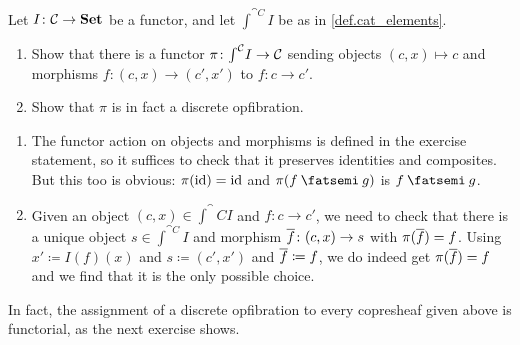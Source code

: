 \documentclass[Book-Poly]{subfiles}
\begin{document}
\begin{exercise} \label{exc.copre_to_dopf}
Let $I\colon\mathcal{C}\to\mathbf{Set}$ be a functor, and let $\int^{\cat{C}}I$ be as in \cref{def.cat_elements}.
\begin{enumerate}
    \item Show that there is a functor $\pi\colon\textstyle{\int}^{\mathcal{C}}I\to\mathcal{C}$ sending objects $(c,x)\mapsto c$ and morphisms $f\colon(c,x)\to(c',x')$ to $f\colon c\to c'$.
    \item Show that $\pi$ is in fact a discrete opfibration. \qedhere
\end{enumerate}
\begin{solution}
\begin{enumerate}
    \item The functor action on objects and morphisms is defined in the exercise statement, so it suffices to check that it preserves identities and composites. But this too is obvious: $\pi(\mathrm{id})=\mathrm{id}$ and $\pi(f\then g)$ is $f\then g$.
    \item Given an object $(c,x)\in\int^\cat{C}I$ and $f\colon c\to c'$, we need to check that there is a unique object $s\in\int^{\cat{C}}I$ and morphism $\overline{f}\colon(c,x)\to s$ with $\pi(\overline{f})=f$. Using $x'\coloneqq I(f)(x)$ and $s\coloneqq(c',x')$ and $\overline{f}\coloneqq f$, we do indeed get $\pi(\overline{f})=f$ and we find that it is the only possible choice.
\end{enumerate}
\end{solution}
\end{exercise}

In fact, the assignment of a discrete opfibration to every copresheaf given above is functorial, as the next exercise shows.
\end{document}

